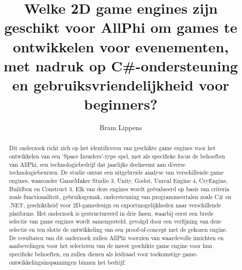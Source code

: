 \documentclass{hogent-article}
\title{Welke 2D game engines zijn geschikt voor AllPhi om games te ontwikkelen voor evenementen, met nadruk op C\#-ondersteuning en gebruiksvriendelijkheid voor beginners?}
\author{Bram Lippens}
\begin{document}
\begin{abstract}
  Dit onderzoek richt zich op het identificeren van geschikte game engines voor het ontwikkelen van een `Space Invaders`-type spel, met als specifieke focus de behoeften van AllPhi, een technologiebedrijf dat jaarlijks deelneemt aan diverse technologiebeurzen. De studie omvat een uitgebreide analyse van verschillende game engines, waaronder GameMaker Studio 3, Unity, Godot, Unreal Engine 4, CryEngine, Buildbox en Construct 3. Elk van deze engines wordt geëvalueerd op basis van criteria zoals functionaliteit, gebruiksgemak, ondersteuning van programmeertalen zoals C\# en .NET, geschiktheid voor 2D-gamedesign en exportmogelijkheden naar verschillende platforms. Het onderzoek is gestructureerd in drie fasen, waarbij eerst een brede selectie van game engines wordt samengesteld, gevolgd door een verfijning van deze selectie en ten slotte de ontwikkeling van een proof-of-concept met de gekozen engine. De resultaten van dit onderzoek zullen AllPhi voorzien van waardevolle inzichten en aanbevelingen voor het selecteren van de meest geschikte game engine voor hun specifieke behoeften, en zullen dienen als leidraad voor toekomstige game-ontwikkelingsinspanningen binnen het bedrijf.
\end{abstract}

\tableofcontents



\printbibliography[heading=bibintoc]
\end{document}
